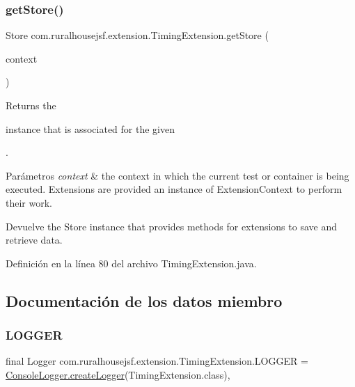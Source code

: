\subsubsection{\texorpdfstring{getStore()}{getStore()}}
{\footnotesize\ttfamily Store com.\+ruralhousejsf.\+extension.\+Timing\+Extension.\+get\+Store (\begin{DoxyParamCaption}\item[{Extension\+Context}]{context }\end{DoxyParamCaption})\hspace{0.3cm}{\ttfamily [private]}}

Returns the
\begin{DoxyCode}{0}
\end{DoxyCode}
 instance that is associated for the given 
\begin{DoxyCode}{0}
\end{DoxyCode}
 .


\begin{DoxyParams}{Parámetros}
{\em context} & the context in which the current test or container is being executed. Extensions are provided an instance of Extension\+Context to perform their work.\\
\hline
\end{DoxyParams}
\begin{DoxyReturn}{Devuelve}
the Store instance that provides methods for extensions to save and retrieve data. 
\end{DoxyReturn}


Definición en la línea 80 del archivo Timing\+Extension.\+java.



\subsection{Documentación de los datos miembro}
\mbox{\label{classcom_1_1ruralhousejsf_1_1extension_1_1_timing_extension_a6c2790b974e4ae4484a4ad0f67ead486}} 
\subsubsection{\texorpdfstring{LOGGER}{LOGGER}}
{\footnotesize\ttfamily final Logger com.\+ruralhousejsf.\+extension.\+Timing\+Extension.\+L\+O\+G\+G\+ER = \mbox{\hyperlink{classcom_1_1ruralhousejsf_1_1logger_1_1_console_logger_a520321643663e37d95761134a35505cd}{Console\+Logger.\+create\+Logger}}(Timing\+Extension.\+class)\hspace{0.3cm}{\ttfamily [static]}, {\ttfamily [private]}}



